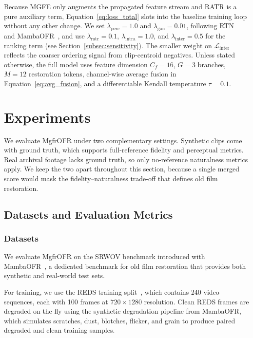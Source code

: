 \documentclass[symmetry,article,submit,pdftex,moreauthors]{Definitions/mdpi}
\begin{document}
Because MGFE only augments the propagated feature stream and RATR is a pure auxiliary term, Equation~\eqref{eq:loss_total} slots into the baseline training loop without any other change. We set $\lambda_{\mathrm{perc}}=1.0$ and $\lambda_{\mathrm{gan}}=0.01$, following RTN~\cite{wan2022rtn} and MambaOFR~\cite{mao2025mambaofr}, and use $\lambda_{\mathrm{ratr}}=0.1$, $\lambda_{\mathrm{intra}}=1.0$, and $\lambda_{\mathrm{inter}}=0.5$ for the ranking term (see Section~\ref{subsec:sensitivity}). The smaller weight on $\mathcal{L}_{\text{inter}}$ reflects the coarser ordering signal from clip-centroid negatives. Unless stated otherwise, the full model uses feature dimension $C_f=16$, $G=3$ branches, $M=12$ restoration tokens, channel-wise average fusion in Equation~\eqref{eq:avg_fusion}, and a differentiable Kendall temperature $\tau=0.1$.
\section{Experiments}
\label{sec:experiment}

We evaluate MgfrOFR under two complementary settings. Synthetic clips come with ground truth, which supports full-reference fidelity and perceptual metrics. Real archival footage lacks ground truth, so only no-reference naturalness metrics apply. We keep the two apart throughout this section, because a single merged score would mask the fidelity--naturalness trade-off that defines old film restoration.

\subsection{Datasets and Evaluation Metrics}
\label{subsec:datasets_metrics}

\subsubsection{Datasets}
\label{subsec:datasets}

We evaluate MgfrOFR on the SRWOV benchmark introduced with MambaOFR~\cite{mao2025mambaofr}, a dedicated benchmark for old film restoration that provides both synthetic and real-world test sets.

For training, we use the REDS training split~\cite{nah2019reds}, which contains 240 video sequences, each with 100 frames at $720 \times 1280$ resolution. Clean REDS frames are degraded on the fly using the synthetic degradation pipeline from MambaOFR, which simulates scratches, dust, blotches, flicker, and grain to produce paired degraded and clean training samples.
\end{document}
